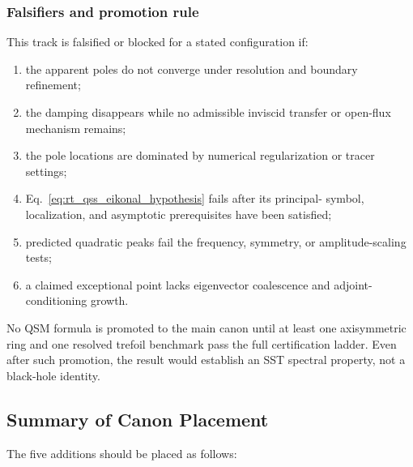     \subsubsection*{Falsifiers and promotion rule}

        This track is falsified or blocked for a stated configuration if:
        \begin{enumerate}
            \item the apparent poles do not converge under resolution and boundary
            refinement;
            \item the damping disappears while no admissible inviscid transfer or
            open-flux mechanism remains;
            \item the pole locations are dominated by numerical regularization or
            tracer settings;
            \item Eq.~\eqref{eq:rt_qss_eikonal_hypothesis} fails after its principal-
            symbol, localization, and asymptotic prerequisites have been satisfied;
            \item predicted quadratic peaks fail the frequency, symmetry, or
            amplitude-scaling tests;
            \item a claimed exceptional point lacks eigenvector coalescence and
            adjoint-conditioning growth.
        \end{enumerate}

        No QSM formula is promoted to the main canon until at least one axisymmetric
        ring and one resolved trefoil benchmark pass the full certification ladder.
        Even after such promotion, the result would establish an SST spectral property,
        not a black-hole identity.

\subsection*{Summary of Canon Placement}
    \label{app:canon-placement-summary}
    
    The five additions should be placed as follows:
    
